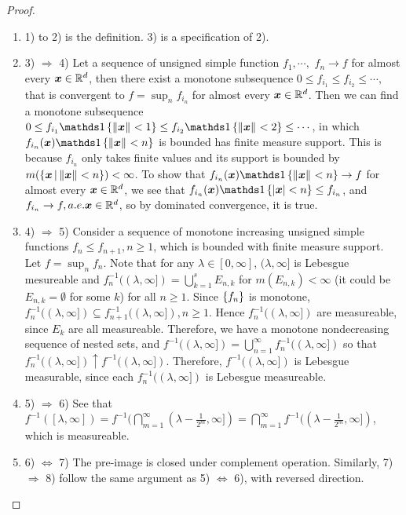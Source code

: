 \documentclass[11pt]{article}
\begin{document}
\begin{itemize}
\begin{lemma}
\begin{enumerate}
\end{enumerate}
\end{lemma}
\begin{proof}
\begin{enumerate}
\item 1) to 2) is the definition.  3) is a specification of 2). 
\item 3) $\Rightarrow$ 4)  Let a sequence of unsigned simple function $f_{1},\cdots,$ $f_{n}\rightarrow f$ for almost every $\boldsymbol{x}\in {\mathbb R}^{d}$, then there exist a monotone subsequence $0\le f_{i_{1}}\le f_{i_{2}} \le \cdots, $ that is convergent to $f = \sup_{n}f_{i_{n}}$ for almost every $\boldsymbol{x}\in {\mathbb R}^{d}$. Then we can find a monotone subsequence $0\le f_{i_{1}}\ind{\norm{\mb{x}}{}<1} \le f_{i_{2}}\ind{\norm{\mb{x}}{}<2} \le \cdots$, in which  $f_{i_n}(\mb{x})\ind{\norm{\mb{x}}{} <n}$ is bounded has finite measure support. This is because $f_{i_n}$ only takes finite values and its support is bounded by $m(\left\{\boldsymbol{x}\,| \left\|\boldsymbol{x}\right\|_{} <n\right\})<\infty$. To show that $f_{i_n}(\mb{x})\ind{\norm{\mb{x}}{} <n} \rightarrow f$ for almost every $\boldsymbol{x}\in {\mathbb R}^{d}$, we see that $f_{i_n}(\mb{x})\ind{\abs{\mb{x}} <n}\le f_{i_n}$, and $f_{i_n}\rightarrow f, a.e. \boldsymbol{x}\in {\mathbb R}^{d}$, so by dominated convergence, it is true. 
\item 4) $\Rightarrow$ 5) Consider a sequence of monotone increasing unsigned simple functions $f_{n}\le f_{n+1}, n\ge 1$, which is bounded with finite measure support. Let  $f = \sup_{n}f_{n}$. Note that for any $\lambda\in [0,\infty]$, $(\lambda, \infty]$ is Lebesgue mesureable and $f_{n}^{-1}((\lambda, \infty])= \bigcup_{k=1}^{s}E_{n,k}$ for $m(E_{n,k})<\infty$ (it could be $E_{n,k} = \emptyset$ for some $k$) for  all $n\ge 1$. Since $\left\{f_{n}\right\}$ is monotone, $f_{n}^{-1}((\lambda, \infty])\subseteq f_{n+1}^{-1}((\lambda, \infty]), n\ge 1$. Hence $f_{n}^{-1}((\lambda, \infty])$ are measureable, since $E_{k}$ are all measureable.  Therefore, we have a monotone nondecreasing sequence of nested sets, and $f^{-1}((\lambda, \infty])= \bigcup_{n=1}^{\infty}f_{n}^{-1}((\lambda, \infty])$ so that $f_{n}^{-1}((\lambda, \infty]) \uparrow f^{-1}((\lambda, \infty])$.  Therefore, $f^{-1}((\lambda, \infty])$ is Lebesgue measurable, since each $f_{n}^{-1}((\lambda, \infty])$ is Lebesgue measureable. 
\item 5) $\Rightarrow$ 6) See that $f^{-1}([\lambda, \infty])= f^{-1}(\bigcap_{m=1}^{\infty}(\lambda-\frac{1}{2^{m}}, \infty])= \bigcap_{m=1}^{\infty}f^{-1}((\lambda-\frac{1}{2^{m}}, \infty])$, which is measureable. 
\item 6) $\Leftrightarrow$ 7) The pre-image is closed under complement operation. Similarly, 7) $\Rightarrow$ 8) follow the same argument as 5) $\Leftrightarrow$ 6), with reversed direction.

\end{enumerate}
\end{proof}
\end{itemize}
\end{document}
